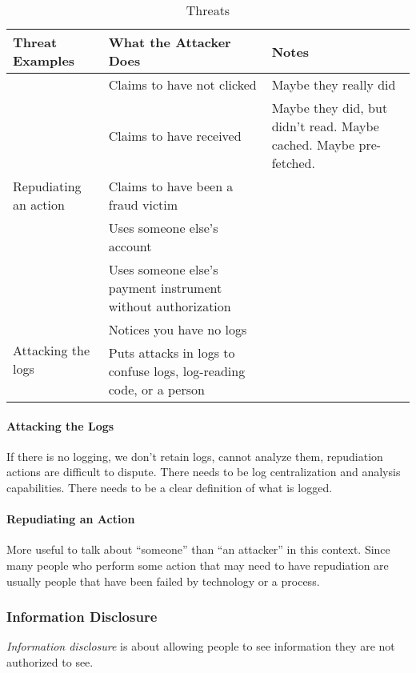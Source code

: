 \begin{table}[h!]
  \centering
  \begin{tabular}{p{5.7cm}p{5.7cm}p{5.7cm}}
    \toprule
    Threat Examples & What the Attacker Does & Notes \\
    \midrule
    \multirow{5}{5.7cm}{Repudiating an action} & Claims to have not clicked & Maybe they really did \\ \cline{2-3}
                                               & Claims to have received & Maybe they did, but didn't read. Maybe cached. Maybe pre-fetched. \\ \cline{2-3}
                                               & Claims to have been a fraud victim & \\ \cline{2-3}
                                               & Uses someone else's account & \\ \cline{2-3}
                                               & Uses someone else's payment instrument without authorization & \\
    \midrule
    \multirow{2}{5.7cm}{Attacking the logs} & Notices you have no logs & \\ \cline{2-3}
                                               & Puts attacks in logs to confuse logs, log-reading code, or a person & \\
    \bottomrule
  \end{tabular}
  \caption{ Threats}
  \label{tab:Repudiation_Threats}
\end{table}

\paragraph{Attacking the Logs}\label{par:Attack_Logs}
If there is no logging, we don't retain logs, cannot analyze them, repudiation actions are difficult to dispute.
There needs to be log centralization and analysis capabilities.
There needs to be a clear definition of what is logged.

\paragraph{Repudiating an Action}\label{par:Repudiating_Action}
More useful to talk about ``someone'' than ``an attacker'' in this context.
Since many people who perform some action that may need to have repudiation are usually people that have been failed by technology or a process.

\subsubsection{Information Disclosure}\label{subsubsec:Information_Disclosure}
\begin{definition}\label{def:Information_Disclosure}
  \emph{Information disclosure} is about allowing people to see information they are not authorized to see.
\end{definition}

